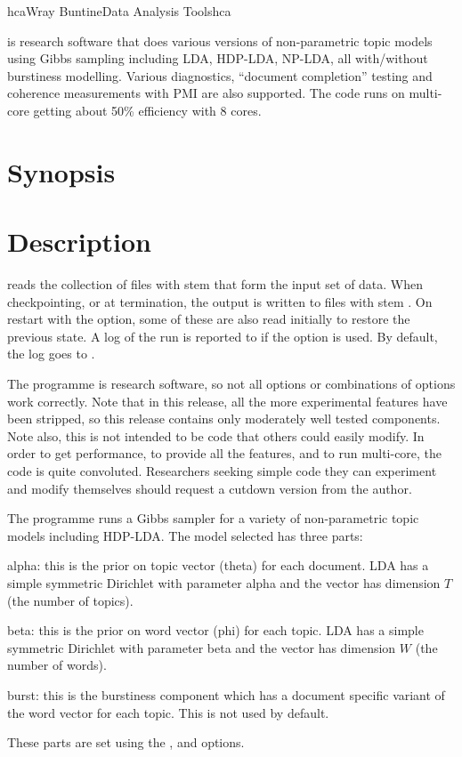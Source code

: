 \documentclass[a4paper,english]{article}
\begin{document}
\begin{Name}{1}{hca}{Wray Buntine}{Data Analysis Tools}{hca}

   is research software
that does various versions of non-parametric topic models using Gibbs sampling including LDA, HDP-LDA, NP-LDA, all with/without burstiness modelling.  Various diagnostics, ``document completion'' testing and coherence measurements with PMI are also supported. The code
runs on multi-core getting about 50\% efficiency with 8 cores.

\end{Name}

\section{Synopsis}

  
                  

\section{Description}
 reads the collection of files with stem
 that form the input set of data.
When checkpointing, or at termination, the output is written
to files with stem  .
On restart with the  option, some of these
are also read initially to restore the previous state.
A log of the run is reported to  if the
 option is used.  By default, the log goes to
.

The programme is research software, so not all options
or combinations of options work correctly.
Note that in this release, all the more experimental features
have been stripped, so this release contains
only moderately well tested components.
Note also, this is not intended to be code that others could easily
modify.  In order to get performance, to provide all the features,
and to run multi-core, the code is quite convoluted.
Researchers seeking simple code they can experiment and
modify themselves should request a cutdown version from the author.

The programme runs a Gibbs sampler for a variety of
non-parametric topic models
including HDP-LDA.
The model selected has three parts:
\begin{Description}[alpha]
\item[alpha:] this is the prior on topic vector (theta) for each document.
LDA has a simple symmetric Dirichlet with parameter alpha
and the vector has dimension $T$ (the number of topics).
\item[beta:] this is the prior on word vector  (phi) for each topic.
LDA has a simple symmetric Dirichlet with parameter beta
and the vector has dimension $W$ (the number of words).
\item[burst:]  this is the burstiness component which has
a document specific variant of the word vector for
each topic.  This is not used by default.
\end{Description}
These parts are set using the
,  and  options.
\end{document}

